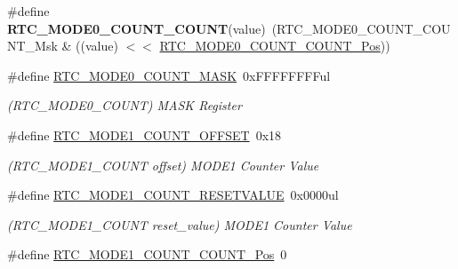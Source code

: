 \begin{DoxyCompactItemize}
\item 
\hypertarget{group___s_a_m_l21___r_t_c_ga54f5c6542fe33f07bfb2d6b3b06debbc}{}\#define {\bfseries R\+T\+C\+\_\+\+M\+O\+D\+E0\+\_\+\+C\+O\+U\+N\+T\+\_\+\+C\+O\+U\+N\+T}(value)~(R\+T\+C\+\_\+\+M\+O\+D\+E0\+\_\+\+C\+O\+U\+N\+T\+\_\+\+C\+O\+U\+N\+T\+\_\+\+Msk \& ((value) $<$$<$ \hyperlink{group___s_a_m_l21___r_t_c_ga1939409f3de229eaa5f11e154a85b00e}{R\+T\+C\+\_\+\+M\+O\+D\+E0\+\_\+\+C\+O\+U\+N\+T\+\_\+\+C\+O\+U\+N\+T\+\_\+\+Pos}))\label{group___s_a_m_l21___r_t_c_ga54f5c6542fe33f07bfb2d6b3b06debbc}

\item 
\hypertarget{group___s_a_m_l21___r_t_c_ga2d1b8990f01f37870f27930c09b3a574}{}\#define \hyperlink{group___s_a_m_l21___r_t_c_ga2d1b8990f01f37870f27930c09b3a574}{R\+T\+C\+\_\+\+M\+O\+D\+E0\+\_\+\+C\+O\+U\+N\+T\+\_\+\+M\+A\+S\+K}~0x\+F\+F\+F\+F\+F\+F\+F\+Ful\label{group___s_a_m_l21___r_t_c_ga2d1b8990f01f37870f27930c09b3a574}

\begin{DoxyCompactList}\small\item\em (R\+T\+C\+\_\+\+M\+O\+D\+E0\+\_\+\+C\+O\+U\+N\+T) M\+A\+S\+K Register \end{DoxyCompactList}\item 
\hypertarget{group___s_a_m_l21___r_t_c_ga43e4d13a4b5fe93151b89041392026e8}{}\#define \hyperlink{group___s_a_m_l21___r_t_c_ga43e4d13a4b5fe93151b89041392026e8}{R\+T\+C\+\_\+\+M\+O\+D\+E1\+\_\+\+C\+O\+U\+N\+T\+\_\+\+O\+F\+F\+S\+E\+T}~0x18\label{group___s_a_m_l21___r_t_c_ga43e4d13a4b5fe93151b89041392026e8}

\begin{DoxyCompactList}\small\item\em (R\+T\+C\+\_\+\+M\+O\+D\+E1\+\_\+\+C\+O\+U\+N\+T offset) M\+O\+D\+E1 Counter Value \end{DoxyCompactList}\item 
\hypertarget{group___s_a_m_l21___r_t_c_gaa67b8859973036aed05a47931d9449ed}{}\#define \hyperlink{group___s_a_m_l21___r_t_c_gaa67b8859973036aed05a47931d9449ed}{R\+T\+C\+\_\+\+M\+O\+D\+E1\+\_\+\+C\+O\+U\+N\+T\+\_\+\+R\+E\+S\+E\+T\+V\+A\+L\+U\+E}~0x0000ul\label{group___s_a_m_l21___r_t_c_gaa67b8859973036aed05a47931d9449ed}

\begin{DoxyCompactList}\small\item\em (R\+T\+C\+\_\+\+M\+O\+D\+E1\+\_\+\+C\+O\+U\+N\+T reset\+\_\+value) M\+O\+D\+E1 Counter Value \end{DoxyCompactList}\item 
\hypertarget{group___s_a_m_l21___r_t_c_ga63560856c47d39bac19c5935c0341e53}{}\#define \hyperlink{group___s_a_m_l21___r_t_c_ga63560856c47d39bac19c5935c0341e53}{R\+T\+C\+\_\+\+M\+O\+D\+E1\+\_\+\+C\+O\+U\+N\+T\+\_\+\+C\+O\+U\+N\+T\+\_\+\+Pos}~0\label{group___s_a_m_l21___r_t_c_ga63560856c47d39bac19c5935c0341e53}


\end{DoxyCompactItemize}
